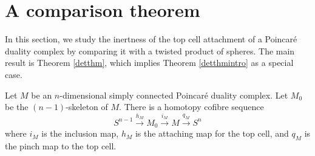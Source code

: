 \documentclass[a4]{amsart}
\theoremstyle{definition}
\begin{document}
\begin{sloppypar}
\newpage


\section{A comparison theorem}
\label{sec: det}
In this section, we study the inertness of the top cell attachment of a Poincar\'{e} duality complex by comparing it with a twisted product of spheres. The main result is Theorem \ref{detthm}, which implies Theorem \ref{detthmintro} as a special case. 

Let $M$ be an $n$-dimensional simply connected Poincar\'{e} duality complex.  Let $M_0$ be the $(n-1)$-skeleton of $M$. There is a homotopy cofibre sequence
\begin{equation}\label{Mcofibeq}
S^{n-1}\stackrel{h_M}{\longrightarrow} M_0\stackrel{i_M}{\longrightarrow}M \stackrel{q_M}{\longrightarrow}S^n
\end{equation}
where $i_M$ is the inclusion map, $h_M$ is the attaching map for the top cell, and $q_M$ is the pinch map to the top cell. 


\end{sloppypar}
\end{document}
